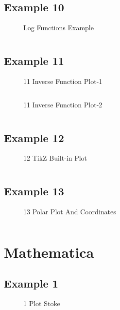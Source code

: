 \subsection{Example 10}
\begin{figure}[!htb]
    \centering
    
    \caption{Log Functions Example}
    \label{fig:10-log-function}
\end{figure}
\inputminted{latex}{./Example/example_10.tex}
\newpage


\subsection{Example 11}
\begin{figure}[!htb]
    \centering
    
    \caption{11 Inverse Function Plot-1}
    \label{fig:11-inverse-function-1}
\end{figure}
\inputminted{latex}{./Example/example_11_2.tex}

\begin{figure}[!htb]
    \centering
    
    \caption{11 Inverse Function Plot-2}
    \label{fig:11-inverse-function-2}
\end{figure}
\inputminted{latex}{./Example/example_11_2.tex}
\newpage

\subsection{Example 12}
\begin{figure}[!htb]
    \centering
    
    \caption{12 TikZ Built-in Plot}
    \label{fig:12-tikz-plot}
\end{figure}
\inputminted{latex}{./Example/example_12.tex}
\newpage

\subsection{Example 13}
\begin{figure}[!htb]
    \centering
    
    \caption{13 Polar Plot And Coordinates}
    \label{fig:13-polar-plot}
\end{figure}
\inputminted{latex}{./Example/example_13.tex}
\newpage


\section{Mathematica}
\subsection{Example 1}
\begin{figure}[!htb]
    \centering
    
    \caption{1 Plot Stoke}
    \label{fig:1-plot-stoke}
\end{figure}
\inputminted{mathematica}{./Example/example_1.wls}
\newpage


